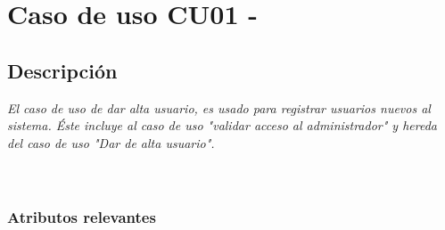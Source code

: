 \newpage
		\section{\textbf{Caso de uso CU01 - }}

			\subsection{Descripci\'on}
				\textsl{El caso de uso de dar alta usuario, es usado para registrar usuarios nuevos al sistema. \'Este incluye al caso de uso "validar acceso al administrador" y hereda del caso de uso "Dar de alta usuario".\\ \\ \\}
			\subsubsection{
				\textbf{Atributos relevantes\\}}

